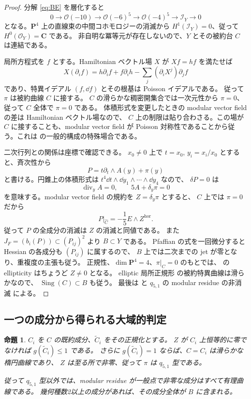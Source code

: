 \documentclass[11pt,a4paper]{ltjsarticle}
\newcommand{\CC}{\mathbf C}\newcommand{\QQ}{\mathbf Q}
\newcommand{\PP}{\mathbf P}\renewcommand{\AA}{\mathbf A}
\newtheorem{proposition}[theorem]{命題}
\theoremstyle{remark}\newtheorem{remark}[theorem]{注意}
\begin{document}
\begin{proof}
分解 \eqref{eq:BE} を層化すると
\[
0\longrightarrow\mathcal O(-10)\longrightarrow\mathcal O(-6)^5
 \longrightarrow\mathcal O(-4)^5\longrightarrow\mathcal I_Y\longrightarrow0
\]
となる。$\PP^4$ 上の直線束の中間コホモロジーの消滅から
$H^1(\mathcal I_Y)=0$、従って $H^0(\mathcal O_Y)=\CC$ である。
非自明な冪等元が存在しないので、$Y$ とその被約台 $C$ は連結である。

局所方程式を $f$ とする。Hamiltonian ベクトル場 $X$ が $Xf=hf$ を満たせば
\[
 X(\partial_i f)=h\partial_i f+f\partial_i h
             -\sum_j(\partial_iX^j)\partial_jf
\]
であり、特異イデアル $(f,\dd f)$ とその根基は Poisson イデアルである。
従って $\pi$ は被約曲線 $C$ に接する。
$C$ の滑らかな稠密開集合では一次元性から $\pi=0$、従って $C$ 全体で $\pi=0$ である。
体積形式を変更したときの modular vector field の差は Hamiltonian ベクトル場なので、
$C$ 上の制限は貼り合わさる。この場が $C$ に接することも、modular vector field が
Poisson 対称性であることから従う。これは \cite[Remark 4.1 とその直前]{PymElliptic}
の一般的構成の特殊場合である。

二次行列との関係は座標で確認できる。
$x_0\ne0$ 上で $t=x_0$, $y_i=x_i/x_0$ とすると、斉次性から
\[
 P=t\partial_t\wedge A(y)+\pi(y)
\]
と書ける。円錐上の体積形式は $t^4\dd t\wedge\dd y_1\wedge\cdots\wedge\dd y_4$ なので、
$\delta P=0$ は
\[
 \operatorname{div}_y A=0,\qquad 5A+\delta_y\pi=0
\]
を意味する。modular vector field の規約を $Z=\delta_y\pi$ とすると、
$C$ 上では $\pi=0$ だから
\[
 P\big|_{\widehat C}=-\frac15 E\wedge Z^{\mathrm{hor}}.\tag{R}\label{eq:residue}
\]
従って $P$ の全成分の消滅は $Z$ の消滅と同値である。
また $J_F=(b_i(P))\subset(P_{ij})^2$ より $B\subset Y$ である。
Pfaffian の式を一回微分すると Hessian の各成分も $(P_{ij})$ に属するので、
$B$ 上では二次までの jet が零となり、重複度の主張も従う。
正規性、$\dim\PP^4=4$、$\pi|_C=0$ のもとでは、
\cite[Definition 4.2]{PymElliptic} の ellipticity はちょうど $Z\ne0$ となる。
elliptic 局所正規形 \cite[Theorem 4.5]{PymElliptic} の被約特異曲線は滑らかなので、
$\operatorname{Sing}(C)\subset B$ も従う。
最後は \cite[Theorem 1.3]{PymElliptic} と
$q_{5,1}$ の modular residue の非消滅 \cite[Proposition 8.5]{GP} による。
\end{proof}

\subsection{一つの成分から得られる大域的判定}

\begin{proposition}\label{prop:active-elliptic-v15}
$C_i$ を $C$ の既約成分、$\widetilde C_i$ をその正規化とする。
$Z$ が $C_i$ 上恒等的に零でなければ $g(\widetilde C_i)\le1$ である。
さらに $g(\widetilde C_i)=1$ ならば、$C=C_i$ は滑らかな楕円曲線であり、
$Z$ は至る所で非零、従って $\pi$ は $q_{5,1}$ 型である。

従って $q_{5,1}$ 型以外では、modular residue が一般点で非零な成分はすべて有理曲線である。
幾何種数2以上の成分があれば、その成分全体が $B$ に含まれる。
\end{proposition}
\end{document}
